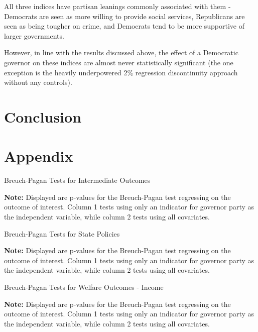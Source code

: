 \documentclass{article}
\begin{document}
All three indices have partisan leanings commonly associated with them - Democrats are seen as more willing to provide social services, Republicans are seen as being tougher on crime, and Democrats tend to be more supportive of larger governments. 

However, in line with the results discussed above, the effect of a Democratic governor on these indices are almost never statistically significant (the one exception is the heavily underpowered 2\% regression discontinuity approach without any controls). 


\section{Conclusion}


\section{Appendix}


\begin{table}[!hbtp]
\caption{Breuch-Pagan Tests for Intermediate Outcomes}

\textbf{Note:} Displayed are p-values for the Breuch-Pagan test regressing on the outcome of interest. Column 1 tests using only an indicator for governor party as the independent variable, while column 2 tests using all covariates. 
\label{table:bp_outcome}
\end{table}

\begin{table}[!hbtp]
\caption{Breuch-Pagan Tests for State Policies}

\textbf{Note:} Displayed are p-values for the Breuch-Pagan test regressing on the outcome of interest. Column 1 tests using only an indicator for governor party as the independent variable, while column 2 tests using all covariates. 
\label{table:bp_policies}
\end{table}

\begin{table}[!hbtp]
\caption{Breuch-Pagan Tests for Welfare Outcomes - Income}

\textbf{Note:} Displayed are p-values for the Breuch-Pagan test regressing on the outcome of interest. Column 1 tests using only an indicator for governor party as the independent variable, while column 2 tests using all covariates. 
\label{table:bp_welfare1}
\end{table}
\end{document}
